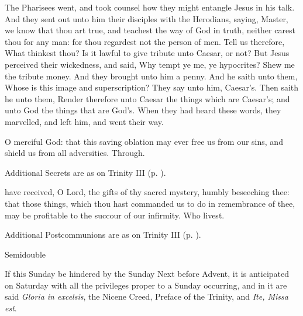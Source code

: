  The Pharisees went, and took counsel how they might entangle Jesus in his talk. And they sent out unto him their disciples with the Herodians, saying, Master, we know that thou art true, and teachest the way of God in truth, neither carest thou for any man: for thou regardest not the person of men. Tell us therefore, What thinkest thou? Is it lawful to give tribute unto Caesar, or not? But Jesus perceived their wickedness, and said, Why tempt ye me, ye hypocrites? Shew me the tribute money. And they brought unto him a penny. And he saith unto them, Whose is this image and superscription? They say unto him, Caesar's. Then saith he unto them, Render therefore unto Caesar the things which are Caesar's; and unto God the things that are God's. When they had heard these words, they marvelled, and left him, and went their way.


\secret
{} O merciful God: that this saving oblation may ever free us from our sins, and shield us from all adversities. Through.
\begin{rubric}
    Additional Secrets are as on Trinity III (p. \pageref{TrinityIII}).
\end{rubric}


\postcommunion
{} have received, O Lord, the gifts of thy sacred mystery, humbly beseeching thee: that those things, which thou hast commanded us to do in remembrance of thee, may be profitable to the succour of our infirmity. Who livest.
\begin{rubric}
    Additional Postcommunions are as on Trinity III (p. \pageref{TrinityIII}).
\end{rubric}

\begin{inhead}
{Semidouble}
\end{inhead}
\begin{rubric}
If this Sunday be hindered by the Sunday Next before Advent, it is anticipated on Saturday with all the privileges proper to a Sunday occurring, and in it are said \emph{Gloria in excelsis}, the Nicene Creed, Preface of the Trinity, and \emph{Ite, Missa est}.
\end{rubric}
\par\noindent
{}

